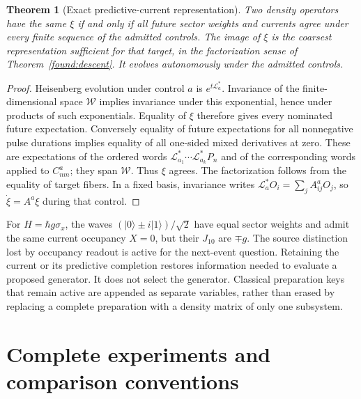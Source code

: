 \documentclass[11pt,oneside,openany]{book}
\newtheorem{theorem}{Theorem}[chapter]
\theoremstyle{definition}
\theoremstyle{remark}\newtheorem{remark}[theorem]{Remark}
\begin{document}
\begin{theorem}[Exact predictive-current representation]\label{found:predictive}
Two density operators have the same $\xi$ if and only if all future sector weights and currents agree under every finite sequence of the admitted controls. The image of $\xi$ is the coarsest representation sufficient for that target, in the factorization sense of Theorem~\ref{found:descent}. It evolves autonomously under the admitted controls.
\end{theorem}
\begin{proof}
Heisenberg evolution under control $a$ is $e^{t\mathcal L_a^*}$. Invariance of the finite-dimensional space $\mathcal W$ implies invariance under this exponential, hence under products of such exponentials. Equality of $\xi$ therefore gives every nominated future expectation. Conversely equality of future expectations for all nonnegative pulse durations implies equality of all one-sided mixed derivatives at zero. These are expectations of the ordered words $\mathcal L_{a_1}^*\cdots\mathcal L_{a_k}^*P_n$ and of the corresponding words applied to $C^a_{nm}$; they span $\mathcal W$. Thus $\xi$ agrees. The factorization follows from the equality of target fibers. In a fixed basis, invariance writes $\mathcal L_a^*O_i=\sum_jA^a_{ij}O_j$, so $\dot\xi=A^a\xi$ during that control.
\end{proof}

For $H=\hbar g\sigma_x$, the waves $(|0\rangle\pm i|1\rangle)/\sqrt2$ have equal sector weights and admit the same current occupancy $X=0$, but their $J_{10}$ are $\mp g$. The source distinction lost by occupancy readout is active for the next-event question. Retaining the current or its predictive completion restores information needed to evaluate a proposed generator. It does not select the generator. Classical preparation keys that remain active are appended as separate variables, rather than erased by replacing a complete preparation with a density matrix of only one subsystem.

\chapter{Complete experiments and comparison conventions}
\label{found:experiments}
\end{document}
